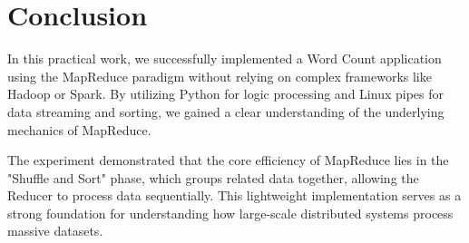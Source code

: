 \documentclass[a4paper,12pt]{article}
\begin{document}
\section{Conclusion}
In this practical work, we successfully implemented a Word Count application using the MapReduce paradigm without relying on complex frameworks like Hadoop or Spark. By utilizing Python for logic processing and Linux pipes for data streaming and sorting, we gained a clear understanding of the underlying mechanics of MapReduce.

The experiment demonstrated that the core efficiency of MapReduce lies in the "Shuffle and Sort" phase, which groups related data together, allowing the Reducer to process data sequentially. This lightweight implementation serves as a strong foundation for understanding how large-scale distributed systems process massive datasets.
\end{document}
